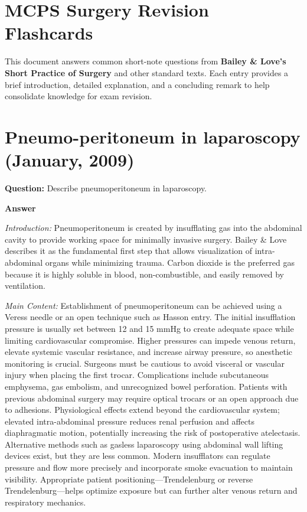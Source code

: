 \documentclass{article}
\begin{document}
\section*{MCPS Surgery Revision Flashcards}


This document answers common short-note questions from \textbf{Bailey \& Love's Short Practice of Surgery} and other standard texts. Each entry provides a brief introduction, detailed explanation, and a concluding remark to help consolidate knowledge for exam revision.


\section{Pneumo-peritoneum in laparoscopy (January, 2009)}


\textbf{Question:} Describe pneumoperitoneum in laparoscopy.

\textbf{Answer}

\emph{Introduction:} Pneumoperitoneum is created by insufflating gas into the abdominal cavity to provide working space for minimally invasive surgery. Bailey \& Love describes it as the fundamental first step that allows visualization of intra-abdominal organs while minimizing trauma. Carbon dioxide is the preferred gas because it is highly soluble in blood, non-combustible, and easily removed by ventilation.

\emph{Main Content:} Establishment of pneumoperitoneum can be achieved using a Veress needle or an open technique such as Hasson entry. The initial insufflation pressure is usually set between 12 and 15 mmHg to create adequate space while limiting cardiovascular compromise. Higher pressures can impede venous return, elevate systemic vascular resistance, and increase airway pressure, so anesthetic monitoring is crucial. Surgeons must be cautious to avoid visceral or vascular injury when placing the first trocar. Complications include subcutaneous emphysema, gas embolism, and unrecognized bowel perforation. Patients with previous abdominal surgery may require optical trocars or an open approach due to adhesions. Physiological effects extend beyond the cardiovascular system; elevated intra-abdominal pressure reduces renal perfusion and affects diaphragmatic motion, potentially increasing the risk of postoperative atelectasis. Alternative methods such as gasless laparoscopy using abdominal wall lifting devices exist, but they are less common. Modern insufflators can regulate pressure and flow more precisely and incorporate smoke evacuation to maintain visibility. Appropriate patient positioning—Trendelenburg or reverse Trendelenburg—helps optimize exposure but can further alter venous return and respiratory mechanics.
\end{document}
